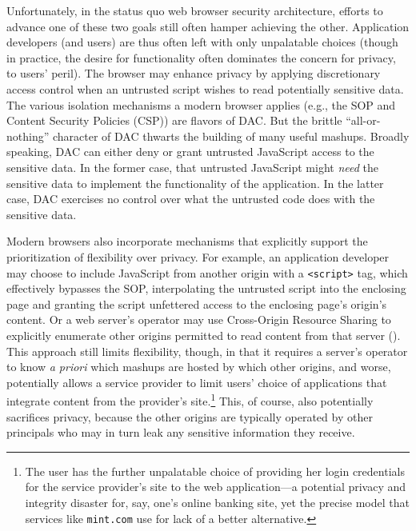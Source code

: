 Unfortunately, in the status quo web browser security architecture,
efforts to advance one of these two goals still often hamper achieving
the other. Application developers (and users) are thus often left with
only unpalatable choices (though in practice, the desire for
functionality often dominates the concern for privacy, to users'
peril). The browser may enhance privacy by applying discretionary
access control when an untrusted script wishes to read
potentially sensitive data. The various isolation mechanisms a modern
browser applies (e.g., the SOP and Content Security Policies (CSP)) are flavors of DAC. But
the brittle ``all-or-nothing'' character of DAC thwarts the building
of many useful mashups. Broadly speaking, DAC can either deny or grant
untrusted JavaScript access to the sensitive data. In the former case,
that untrusted JavaScript might {\em need} the sensitive data to
implement the functionality of the application. In the latter case,
DAC exercises no control over what the untrusted code does with the
sensitive data.

Modern browsers also incorporate mechanisms that explicitly support
the prioritization of flexibility over privacy. For example, an
application developer may choose to include JavaScript from another
origin with a {\tt <script>} tag, which effectively bypasses the SOP,
interpolating the untrusted script into the enclosing page and
granting the script unfettered access to the enclosing page's origin's
content. Or a web server's operator may use Cross-Origin Resource
Sharing to
explicitly enumerate other origins permitted to read content from that
server ().
This approach still limits flexibility, though, in that it requires a
server's operator to know {\em a priori} which mashups are hosted by
which other origins, and worse, potentially allows a service provider
to limit users' choice of applications that integrate content from the
provider's site.\footnote{The user has the further unpalatable
  choice of providing her login credentials for the service
  provider's site to the web application---a potential
  privacy and integrity disaster for, say, one's online banking site,
  yet the precise model that services like {\tt mint.com} use for lack
  of a better alternative.} This, of course, also potentially sacrifices
privacy, because the other origins are typically operated by other
principals who may in turn leak any sensitive information they
receive.

